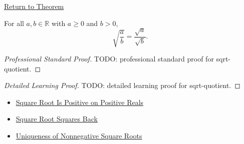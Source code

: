 \newpage
{}
\label{prf:sqrt-quotient}

\begin{remark*}[Return]
\hyperref[thm:sqrt-quotient]{Return to Theorem}
\end{remark*}

\begin{theorem*}
For all $a,b\in\mathbb{R}$ with $a\ge0$ and $b>0$,
\[
\sqrt{\frac{a}{b}}=\frac{\sqrt a}{\sqrt b}.
\]
\end{theorem*}

\begin{proof}[Professional Standard Proof]
\LRAProofBodyStart
TODO: professional standard proof for sqrt-quotient.
\end{proof}

\begin{proof}[Detailed Learning Proof]
\LRAProofBodyStart
TODO: detailed learning proof for sqrt-quotient.
\end{proof}

\begin{remark*}
\end{remark*}

\begin{dependencies}
\begin{itemize}
  \item \hyperref[thm:sqrt-positive]{Square Root Is Positive on Positive Reals}
  \item \hyperref[thm:sqrt-square]{Square Root Squares Back}
  \item \hyperref[thm:uniqueness-of-nonnegative-square-roots]{Uniqueness of Nonnegative Square Roots}
\end{itemize}
\end{dependencies}

\clearpage
